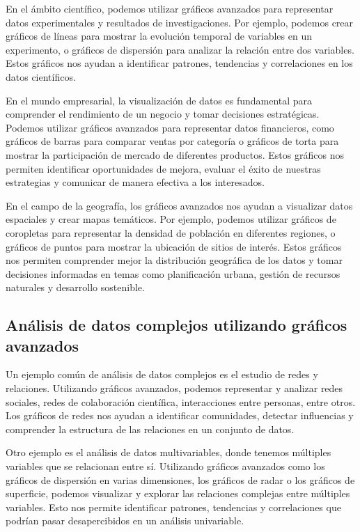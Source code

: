 \documentclass[
  a4paper,
]{article}
\begin{document}
En el ámbito científico, podemos utilizar gráficos avanzados para
representar datos experimentales y resultados de investigaciones. Por
ejemplo, podemos crear gráficos de líneas para mostrar la evolución
temporal de variables en un experimento, o gráficos de dispersión para
analizar la relación entre dos variables. Estos gráficos nos ayudan a
identificar patrones, tendencias y correlaciones en los datos
científicos.

En el mundo empresarial, la visualización de datos es fundamental para
comprender el rendimiento de un negocio y tomar decisiones estratégicas.
Podemos utilizar gráficos avanzados para representar datos financieros,
como gráficos de barras para comparar ventas por categoría o gráficos de
torta para mostrar la participación de mercado de diferentes productos.
Estos gráficos nos permiten identificar oportunidades de mejora, evaluar
el éxito de nuestras estrategias y comunicar de manera efectiva a los
interesados.

En el campo de la geografía, los gráficos avanzados nos ayudan a
visualizar datos espaciales y crear mapas temáticos. Por ejemplo,
podemos utilizar gráficos de coropletas para representar la densidad de
población en diferentes regiones, o gráficos de puntos para mostrar la
ubicación de sitios de interés. Estos gráficos nos permiten comprender
mejor la distribución geográfica de los datos y tomar decisiones
informadas en temas como planificación urbana, gestión de recursos
naturales y desarrollo sostenible.

\hypertarget{anuxe1lisis-de-datos-complejos-utilizando-gruxe1ficos-avanzados}{%
\subsection{Análisis de datos complejos utilizando gráficos
avanzados}\label{anuxe1lisis-de-datos-complejos-utilizando-gruxe1ficos-avanzados}}

Un ejemplo común de análisis de datos complejos es el estudio de redes y
relaciones. Utilizando gráficos avanzados, podemos representar y
analizar redes sociales, redes de colaboración científica, interacciones
entre personas, entre otros. Los gráficos de redes nos ayudan a
identificar comunidades, detectar influencias y comprender la estructura
de las relaciones en un conjunto de datos.

Otro ejemplo es el análisis de datos multivariables, donde tenemos
múltiples variables que se relacionan entre sí. Utilizando gráficos
avanzados como los gráficos de dispersión en varias dimensiones, los
gráficos de radar o los gráficos de superficie, podemos visualizar y
explorar las relaciones complejas entre múltiples variables. Esto nos
permite identificar patrones, tendencias y correlaciones que podrían
pasar desapercibidos en un análisis univariable.
\end{document}
